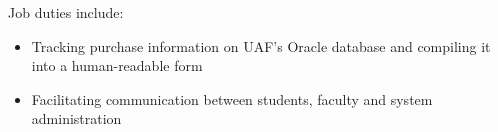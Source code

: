 \normalsize
Job duties include:
\small
\begin{itemize}
    \item Tracking purchase information on UAF's Oracle database and compiling it into a human-readable form
    \item Facilitating communication between students, faculty and system administration
\end{itemize}
\normalsize
\medskip
